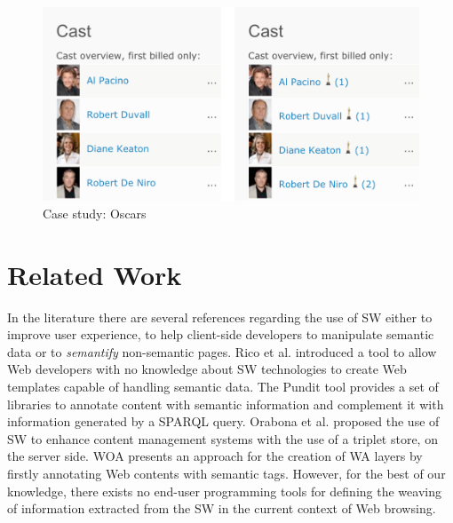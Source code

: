 \documentclass[runningheads]{llncs}
\begin{document}
\begin{figure}
  \centering
    \includegraphics[width=0.7\linewidth]{oscars6.png}
    \caption{Case study: Oscars}
    \label{fig-oscars}
\end{figure}



\section{Related Work}
\label{sec-related_work}
In the literature there are several references regarding the use of SW either to improve user experience, to help client-side developers to manipulate semantic data or to \textit{semantify} non-semantic pages. 
Rico et al. \cite{Rico2012AData} introduced a tool to allow Web developers with no knowledge about SW technologies to create Web templates capable of handling semantic data. 
The Pundit \cite{Grassi2013Pundit:Semantics} tool provides a set of libraries to annotate content with semantic information and complement it with information generated by a SPARQL query. 
Orabona et al. \cite{Orabona2015AnPortals.} proposed the use of SW to enhance content management systems with the use of a triplet store, on the server side. 
WOA \cite{DBLP:conf/icwe/FirmenichBRWB16} presents an approach for the creation of WA layers by firstly annotating Web contents with semantic tags. 
However, for the best of our knowledge, there exists no end-user programming tools for defining the weaving of information extracted from the SW in the current context of Web browsing.
 
\end{document}
